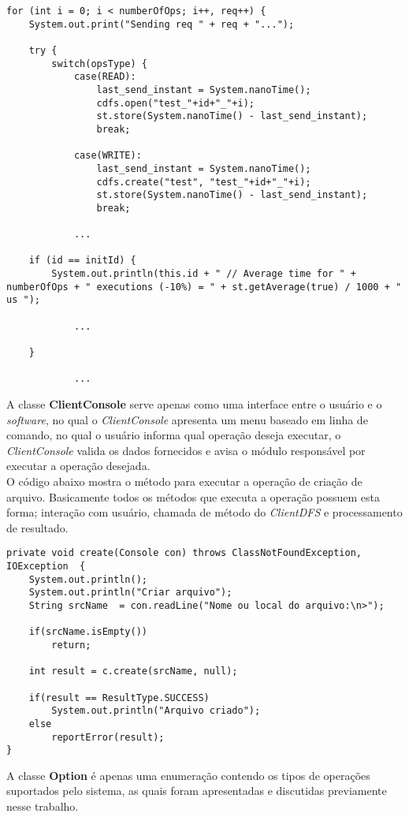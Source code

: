\begin{lstlisting}[basicstyle=\ttfamily\footnotesize, frame=single]
for (int i = 0; i < numberOfOps; i++, req++) {
	System.out.print("Sending req " + req + "...");
	
	try {
		switch(opsType) {
			case(READ):
				last_send_instant = System.nanoTime();
				cdfs.open("test_"+id+"_"+i);
				st.store(System.nanoTime() - last_send_instant);
				break;
			
			case(WRITE):
				last_send_instant = System.nanoTime();
				cdfs.create("test", "test_"+id+"_"+i);
				st.store(System.nanoTime() - last_send_instant);
				break;
			
			...
			
	if (id == initId) {
		System.out.println(this.id + " // Average time for " + numberOfOps + " executions (-10%) = " + st.getAverage(true) / 1000 + " us ");
		
			...
			
	}	
		
			...
\end{lstlisting}
 


A classe \textbf{ClientConsole} serve apenas como uma interface entre o usuário e o \textit{software}, no qual o \textit{ClientConsole} apresenta um menu baseado em linha de comando, no qual o usuário informa qual operação deseja executar, o \textit{ClientConsole} valida os dados fornecidos e avisa o módulo responsável por executar a operação desejada.
\\

O código abaixo mostra o método para executar a operação de criação de arquivo.
Basicamente todos os métodos que executa a operação possuem esta forma; interação com usuário, chamada de método do \textit{ClientDFS} e processamento de resultado.
\begin{lstlisting}[basicstyle=\ttfamily\footnotesize, frame=single]
private void create(Console con) throws ClassNotFoundException, IOException  {
	System.out.println();
	System.out.println("Criar arquivo");
	String srcName  = con.readLine("Nome ou local do arquivo:\n>");
	
	if(srcName.isEmpty())
		return;
	
	int result = c.create(srcName, null);
	
	if(result == ResultType.SUCCESS)
		System.out.println("Arquivo criado");
	else
		reportError(result);
}
\end{lstlisting}

A classe \textbf{Option} é apenas uma enumeração contendo os tipos de operações suportados pelo sistema, as quais foram apresentadas e discutidas previamente nesse trabalho.
\\

